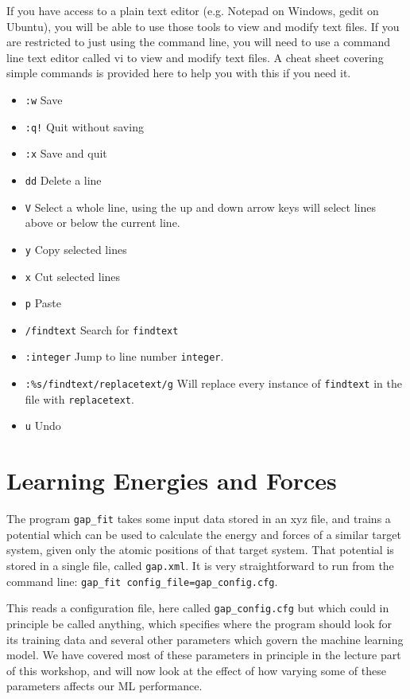 \documentclass{article}
\begin{document}
If you have access to a plain text editor (e.g. Notepad on Windows, gedit on Ubuntu), you will be able to use those tools to view and modify text files. If you are restricted to just using the command line, you will need to use a command line text editor called vi to view and modify text files. A cheat sheet covering simple commands is provided here to help you with this if you need it.

\begin{itemize}
    \item \texttt{:w} Save
    \item \texttt{:q!} Quit without saving
    \item \texttt{:x} Save and quit
    \item \texttt{dd} Delete a line
    \item \texttt{V} Select a whole line, using the up and down arrow keys will select lines above or below the current line.
    \item \texttt{y} Copy selected lines
    \item \texttt{x} Cut selected lines
    \item \texttt{p} Paste
    \item \texttt{/findtext} Search for \texttt{findtext}
    \item \texttt{:integer} Jump to line number \texttt{integer}.
    \item \texttt{:\%s/findtext/replacetext/g} Will replace every instance of \texttt{findtext} in the file with \texttt{replacetext}.
    \item \texttt{u} Undo
\end{itemize}

\section{Learning Energies and Forces}

The program \verb|gap_fit| takes some input data stored in an xyz file, and trains a potential which can be used to calculate the energy and forces of a similar target system, given only the atomic positions of that target system. That potential is stored in a single file, called \verb|gap.xml|. It is very straightforward to run from the command line: \verb|gap_fit config_file=gap_config.cfg|.

This reads a configuration file, here called \verb|gap_config.cfg| but which could in principle be called anything, which specifies where the program should look for its training data and several other parameters which govern the machine learning model. We have covered most of these parameters in principle in the lecture part of this workshop, and will now look at the effect of how varying some of these parameters affects our ML performance.
\end{document}
